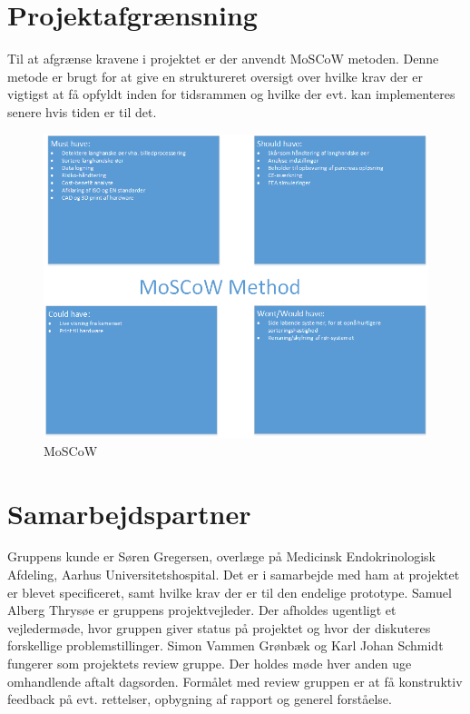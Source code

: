 \section{Projektafgrænsning}
Til at afgrænse kravene i projektet er der anvendt MoSCoW metoden. Denne metode er brugt for at give en struktureret oversigt over hvilke krav der er vigtigst at få opfyldt inden for tidsrammen og hvilke der evt. kan implementeres senere hvis tiden er til det.

\begin{figure}[H]
	\centering
	\includegraphics[width=1\textwidth]{billeder/MoSCoW.png}
	\caption{MoSCoW}
	\label{fig:moscow}
\end{figure}

\section{Samarbejdspartner}
Gruppens kunde er Søren Gregersen, overlæge på Medicinsk Endokrinologisk Afdeling, Aarhus Universitetshospital. Det er i samarbejde med ham at projektet er blevet specificeret, samt hvilke krav der er til den endelige prototype.
Samuel Alberg Thrysøe er gruppens projektvejleder. Der afholdes ugentligt et vejledermøde, hvor gruppen giver status på projektet og hvor der diskuteres forskellige problemstillinger. 
Simon Vammen Grønbæk og Karl Johan Schmidt fungerer som projektets review gruppe. Der holdes møde hver anden uge omhandlende aftalt dagsorden. Formålet med review gruppen er at få konstruktiv feedback på evt. rettelser, opbygning af rapport og generel forståelse.
